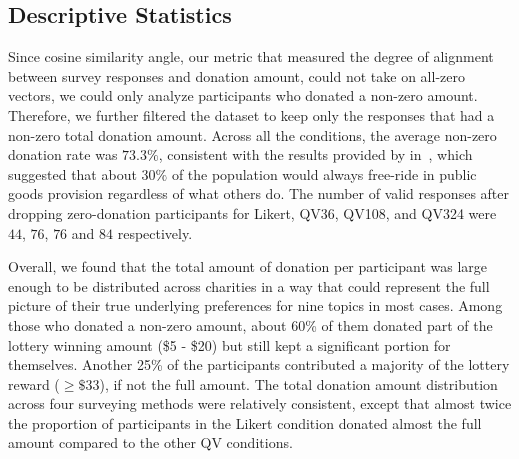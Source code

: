 \subsection{Descriptive Statistics}
Since cosine similarity angle, our metric that measured the degree of alignment between survey responses and donation amount, could not take on all-zero vectors, we could only analyze participants who donated a non-zero amount. Therefore, we further filtered the dataset to keep only the responses that had a non-zero total donation amount. Across all the conditions, the average non-zero donation rate was $73.3\%$, consistent with the results provided by \textcite{fehr2007human} in~\citeyear{fehr2007human}, which suggested that about $30\%$ of the population would always free-ride in public goods provision regardless of what others do. The number of valid responses after dropping zero-donation participants for Likert, QV36, QV108, and QV324 were $44$, $76$, $76$ and $84$ respectively.

Overall, we found that the total amount of donation per participant was large enough to be distributed across charities in a way that could represent the full picture of their true underlying preferences for nine topics in most cases. Among those who donated a non-zero amount, about 60\% of them donated part of the lottery winning amount (\$5 - \$20) but still kept a significant portion for themselves. Another 25\% of the participants contributed a majority of the lottery reward ($\geq \$33$), if not the full amount. The total donation amount distribution across four surveying methods were relatively consistent, except that almost twice the proportion of participants in the Likert condition donated almost the full amount compared to the other QV conditions. {}

